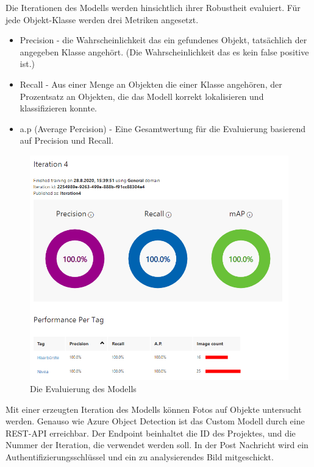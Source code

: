Die Iterationen des Modells werden hinsichtlich ihrer Robustheit evaluiert. Für jede Objekt-Klasse werden drei Metriken angesetzt. 
\begin{itemize}
	\item Precision - die Wahrscheinlichkeit das ein gefundenes Objekt, tatsächlich der angegeben Klasse angehört. (Die Wahrscheinlichkeit das es kein false positive ist.)
	\item Recall - Aus einer Menge an Objekten die einer Klasse angehören, der Prozentsatz an Objekten, die das Modell korrekt lokalisieren und klassifizieren konnte.
	\item a.p (Average Percision) - Eine Gesamtwertung für die Evaluierung basierend auf Precision und Recall. 
\end{itemize}

\begin{figure}[H]
	\centering
	\includegraphics[width=1\textwidth]{images/trainingevaluation.png}
	\caption[]{Die Evaluierung des Modells}
	\label{img:trainineval}
\end{figure}

Mit einer erzeugten Iteration des Modells können Fotos auf Objekte untersucht werden. Genauso wie Azure Object Detection ist das Custom Modell durch eine REST-API erreichbar. 
Der Endpoint beinhaltet die ID des Projektes, und die Nummer der Iteration, die verwendet werden soll.
In der Post Nachricht wird ein Authentifizierungsschlüssel und ein zu analysierendes Bild mitgeschickt.

